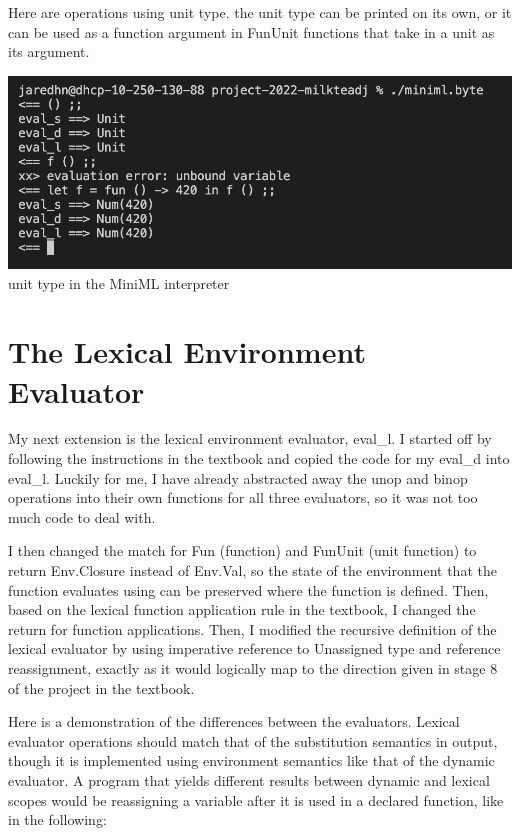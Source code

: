 \documentclass[12pt]{article}
\begin{document}
Here are operations using unit type. the unit type can be printed on its own, or it can be used as a function argument in FunUnit functions that take in a unit as its argument. 
\begin{center}
\includegraphics[width=15cm]{unit.png}\\
unit type in the MiniML interpreter
\end{center}

\pagebreak
\section{The Lexical Environment Evaluator}

My next extension is the lexical environment evaluator, eval\_l. I started off by following the instructions in the textbook and copied the code for my eval\_d into eval\_l. Luckily for me, I have already abstracted away the unop and binop operations into their own functions for all three evaluators, so it was not too much code to deal with. 

I then changed the match for Fun (function) and FunUnit (unit function) to return Env.Closure instead of Env.Val, so the state of the environment that the function evaluates using can be preserved where the function is defined. Then, based on the lexical function application rule in the textbook, I changed the return for function applications. Then, I modified the recursive definition of the lexical evaluator by using imperative reference to Unassigned type and reference reassignment, exactly as it would logically map to the direction given in stage 8 of the project in the textbook. 

Here is a demonstration of the differences between the evaluators. Lexical evaluator operations should match that of the substitution semantics in output, though it is implemented using environment semantics like that of the dynamic evaluator. A program that yields different results between dynamic and lexical scopes would be reassigning a variable after it is used in a declared function, like in the following: 
\end{document}
